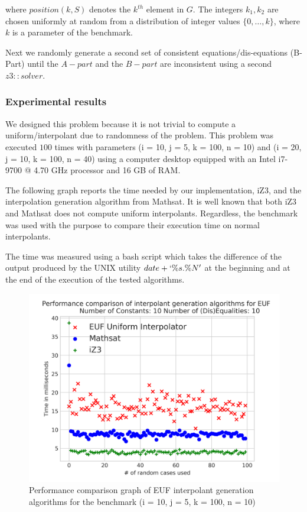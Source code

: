 where $position(k, S)$ denotes the $k^{th}$ element in $G$. The 
integers $k_1, k_2$ are chosen uniformly at random from a
distribution of integer values $\{0, \dots, k\}$, 
where $k$ is a parameter of the benchmark.

Next we randomly generate a second set of consistent 
equations/dis-equations (B-Part) until the $A-part$ and the
$B-part$ are inconsistent using a second $z3: :solver$.

\subsubsection{Experimental results}

We designed this problem because it is not trivial to 
compute a  uniform/interpolant due to randomness of the
problem. This problem was executed $100$ times
with parameters (i = 10, j = 5, k = 100, n = 10) and 
(i = 20, j = 10, k = 100, n = 40)
using a computer desktop
equipped with an Intel i7-9700 @ 4.70 GHz processor 
and 16 GB of RAM. 

The following graph reports the time needed
by our implementation, iZ3, and the interpolation 
generation algorithm from Mathsat. 
It is well known that both iZ3 and Mathsat does not
compute uniform interpolants. Regardless, the benchmark
was used with the purpose to compare their execution time
on normal interpolants.

The time was
measured using a bash script which takes the difference
of the output produced by the UNIX utility $date +`\%s.\%N'$ 
at the beginning and at the end of the execution of the 
tested algorithms.

\begin{figure}
  \centering
  \includegraphics[scale=0.9]{figures/eufi_performance_graph_10_5_3_10_100}
  \caption{Performance comparison graph of EUF interpolant generation
  algorithms for the benchmark (i = 10, j = 5, k = 100, n = 10)}
  \label{performance_graph_euf}
\end{figure}

